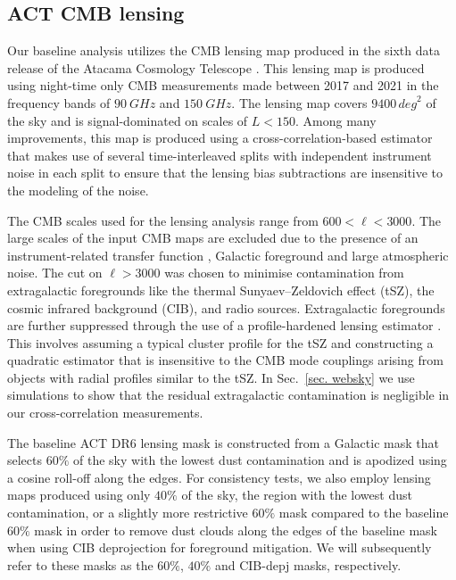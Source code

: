 \documentclass[twocolumn]{aastex631}
\begin{document}
{\subsection{ACT CMB lensing}\label{act_map}
Our baseline analysis utilizes the CMB lensing map produced in the sixth data release of the Atacama Cosmology Telescope    
\citep[hereafter DR6 lensing map]{qu2023atacama,ACT:2023kun}. This lensing map is produced using night-time only CMB measurements made between 2017 and 2021 in the frequency bands of $90 ~\si{GHz}$ and $150 ~\si{GHz}$. 
The lensing map covers $9400\, \si{deg}^2$ of the sky and is signal-dominated on scales of $L<150$. Among many improvements, this map is produced using a cross-correlation-based estimator that makes use of several time-interleaved splits with independent instrument noise in each split to ensure that the lensing bias subtractions are insensitive to the modeling of the noise. 

The CMB scales used for the lensing analysis range from $600<\ell<3000$. The large scales of the input CMB maps are excluded due to the presence of an instrument-related transfer function \citep{Naess:2022jri}, Galactic foreground and large atmospheric noise. The cut on $\ell>3000$ was chosen to minimise contamination from extragalactic foregrounds like the thermal Sunyaev--Zeldovich effect (tSZ), the cosmic infrared background (CIB), and radio sources. Extragalactic foregrounds are further suppressed through the use of a profile-hardened lensing estimator \citep{PhysRevD.102.063517, PhysRevD.107.023504}. This involves assuming a typical cluster profile for the tSZ and constructing a quadratic estimator that is insensitive to the CMB mode couplings arising from objects with radial profiles similar to the tSZ.  In Sec.~\ref{sec. websky} we use simulations to show that the residual extragalactic contamination is negligible in our cross-correlation measurements.

The baseline ACT DR6 lensing mask is constructed from a Galactic mask that selects $60\%$ of the sky with the lowest dust contamination and is apodized using a cosine roll-off along the edges. For consistency tests, we also employ lensing maps produced using only $40\%$ of the sky, the region with the lowest dust contamination, or a slightly more restrictive $60\%$ mask compared to the baseline $60\%$ mask  in order to remove dust clouds along the edges of the baseline mask when using CIB deprojection for foreground mitigation. We will subsequently refer to these masks as the $60\%$, $40\%$ and CIB-depj masks, respectively.

}
\end{document}
